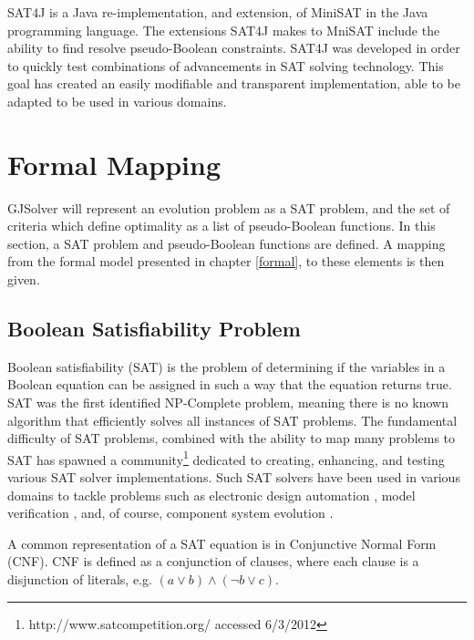 SAT4J \citep{le2010sat4j} is a Java re-implementation, and extension, of MiniSAT in the Java programming language.
The extensions SAT4J makes to MniSAT include the ability to find resolve pseudo-Boolean constraints.
SAT4J was developed in order to quickly test combinations of advancements in SAT solving technology.
This goal has created an easily modifiable and transparent implementation, able to be adapted to be used in various domains.

\section{Formal Mapping}
\label{impl.mapping}
GJSolver will represent an evolution problem as a SAT problem, and the set of criteria which define optimality as a list of pseudo-Boolean functions.
In this section, a SAT problem and pseudo-Boolean functions are defined.
A mapping from the formal model presented in chapter \ref{formal}, to these elements is then given. 

\subsection{Boolean Satisfiability Problem}
Boolean satisfiability (SAT) is the problem of determining if the variables in a Boolean equation can be assigned in such a way that the equation returns true.
SAT was the first identified NP-Complete problem, meaning there is no known algorithm that efficiently solves all instances of SAT problems.
The fundamental difficulty of SAT problems, 
combined with the ability to map many problems to SAT has spawned a community\footnote{http://www.satcompetition.org/ accessed 6/3/2012} 
dedicated to creating, enhancing, and testing various SAT solver implementations. 
Such SAT solvers have been used in various domains to tackle problems such as electronic design automation \citep{Marques-Silva2000}, 
model verification \citep{dennis2006}, and, of course, component system evolution \citep{leBerre2010}.

A common representation of a SAT equation is in Conjunctive Normal Form (CNF).
CNF is defined as a conjunction of clauses, 
where each clause is a disjunction of literals, e.g. $(a \vee b) \wedge (\neg b \vee c)$.

